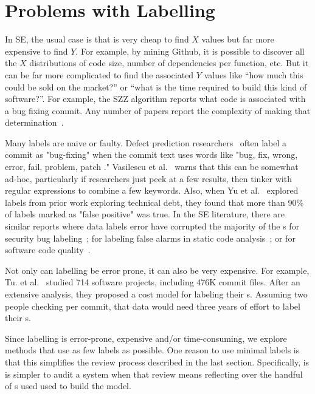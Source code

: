 \section{  Problems with Labelling}\label{label}


In SE, the usual case is that  is very cheap to find $X$ values but far  more expensive to find   $Y$. For example, by mining Github, it is possible to discover all the $X$ distributions of code size, number of dependencies per function, etc. But it can be far more complicated to find the  associated $Y$ values like ``how much this could be sold on the market?'' or ``what is the time required
to build this kind of software?''. For example, the SZZ algorithm reports what code is associated with a  bug fixing commit. Any number of papers report the complexity of making that determination~\cite{herbold2022problems,ROSA2023111729}.

Many labels are naive or faulty. 
Defect prediction researchers~\cite{catolino2017just, hindle2008large, kamei2012large, kim2008classifying, mockus2000identifying} often  label a commit as "bug-fixing" when the commit text uses words like "bug, fix, wrong, error, fail, problem, patch ." Vasilescu et al.~\cite{vasilescu2018personnel, vasilescu2015quality} warns that this can be somewhat ad-hoc, particularly if researchers just peek at a few results, then tinker with regular expressions to combine a few keywords.
 Also, when Yu et al.~\cite{9226105} explored labels from prior work exploring technical debt, they found that more than 90\% of labels marked as "false positive" was true. In the SE literature, there are similar reports where data labels error have corrupted the majority of the {\eg}s for security bug labeling~\cite{ 9371393}; for labeling false alarms in static code analysis~\cite{10.1145/3510003.3510214}; or for software code quality~\cite{Shepperd13}.
    
Not only can labelling be error prone, it can  also be very expensive. 
For example, Tu. et al.~\cite{tu2020better}   studied  714 software projects, including 476K commit files. After an extensive analysis, they  proposed a cost model for labeling their {\eg}s. Assuming two people checking per commit, that data would need three years of effort to label their {\eg}s. 

Since labelling is error-prone, expensive and/or time-consuming, we explore methods that use     as few labels as possible.
One reason
to use minimal labels is that this simplifies the review process described in the last section. Specifically, is is simpler to audit a system when that review means   reflecting over the handful of {\eg}s used used to build the model.  


